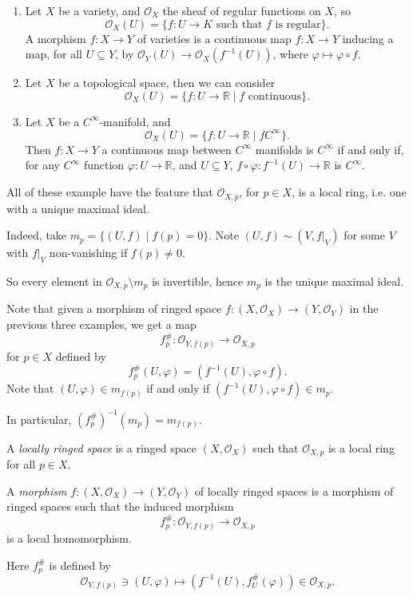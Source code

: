 \documentclass[12pt]{article}
\begin{document}
\begin{exbox}
	\begin{enumerate}
		\item Let $X$ be a variety, and $\mathcal{O}_X$ the sheaf of regular functions on $X$, so
			\[
				\mathcal{O}_X(U) = \{f : U \to K \text{ such that $f$ is regular}\}.
			\]
			A morphism $f : X \to Y$ of varieties is a continuous map $f : X \to Y$ inducing a map, for all $U \subseteq Y$, by $\mathcal{O}_Y(U) \to \mathcal{O}_X(f^{-1}(U))$, where $\varphi \mapsto \varphi \circ f$.
		\item Let $X$ be a topological space, then we can consider
			\[
				\mathcal{O}_X(U) = \{f : U \to \mathbb{R} \mid f \text{ continuous}\}.
			\]
		\item Let $X$ be a $C^\infty$-manifold, and
			\[
				\mathcal{O}_X(U) = \{f : U \to \mathbb{R} \mid f C^\infty\}.
			\]
			Then $f : X \to Y$ a continuous map between $C^\infty$ manifolds is $C^\infty$ if and only if, for any $C^\infty$ function $\varphi : U \to \mathbb{R}$, and $U \subseteq Y$, $f \circ \varphi : f^{-1}(U) \to \mathbb{R}$ is $C^\infty$.
	\end{enumerate}	
\end{exbox}

\begin{remark}
	All of these example have the feature that $\mathcal{O}_{X, p}$, for $p \in X$, is a local ring, i.e. one with a unique maximal ideal.

	Indeed, take $m_p = \{(U, f) \mid f(p) = 0\}$. Note $(U, f) \sim (V, f|_V)$ for some $V$ with $f|_V$ non-vanishing if $f(p) \neq 0$.

	So every element in $\mathcal{O}_{X, p} \setminus m_p$ is invertible, hence $m_p$ is the unique maximal ideal.
\end{remark}

Note that given a morphism of ringed space $f : (X, \mathcal{O}_X) \to (Y, \mathcal{O}_Y)$ in the previous three examples, we get a map
\[
f_p^{\#} : \mathcal{O}_{Y, f(p)} \to \mathcal{O}_{X, p}
\]
for $p \in X$ defined by
\[
f_p^{\#}(U, \varphi) = (f^{-1}(U), \varphi \circ f).
\]
Note that $(U, \varphi) \in m_{f(p)}$ if and only if $(f^{-1}(U), \varphi \circ f) \in m_p$.

In particular, $(f_p^{\#})^{-1}(m_p) = m_{f(p)}$.

\begin{definition}
	A \emph{locally ringed space} is a ringed space $(X, \mathcal{O}_X)$ such that $\mathcal{O}_{X, p}$ is a local ring for all $p \in X$.

	A \emph{morphism} $f : (X, \mathcal{O}_X) \to (Y, \mathcal{O}_Y)$ of locally ringed spaces is a morphism of ringed spaces such that the induced morphism
	\[
	f_p^{\#} : \mathcal{O}_{Y, f(p)} \to \mathcal{O}_{X, p}
	\]
	is a local homomorphism.

	Here $f_p^{\#}$ is defined by
	\[
	\mathcal{O}_{Y, f(p)} \ni (U, \varphi) \mapsto (f^{-1}(U), f_U^{\#}(\varphi)) \in \mathcal{O}_{X, p}.
	\]
\end{definition}
\end{document}
